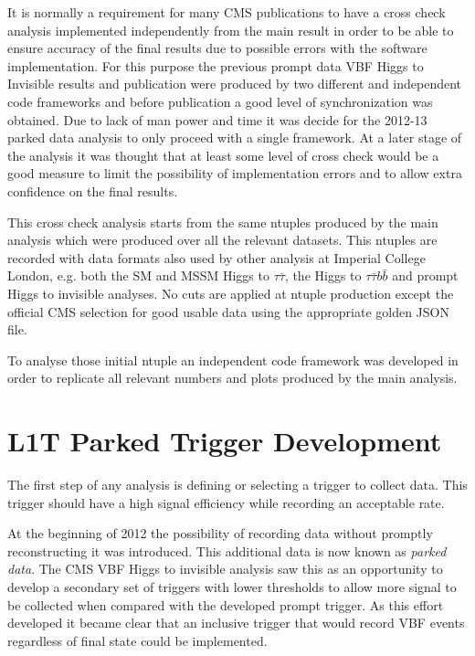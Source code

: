
It is normally a requirement for many CMS publications to have a cross check analysis implemented independently from the main result in order to be able to ensure accuracy of the final results due to possible errors with the software implementation. For this purpose the previous prompt data \gls{VBF} Higgs to Invisible results and publication were produced by two different and independent code frameworks and before publication a good level of synchronization was obtained. Due to lack of man power and time it was decide for the 2012-13 parked data analysis to only proceed with a single framework. At a later stage of the analysis it was thought that at least some level of cross check would be a good measure to limit the possibility of implementation errors and to allow extra confidence on the final results.
 
This cross check analysis starts from the same ntuples produced by the main analysis which were produced over all the relevant datasets. This ntuples are recorded with data formats also used by other analysis at Imperial College London, e.g. both the \gls{SM} and \gls{MSSM} Higgs to $\tau\bar{\tau}$, the Higgs to $\tau\bar{\tau}b\bar{b}$ and prompt Higgs to invisible analyses. No cuts are applied at ntuple production except the official \gls{CMS} selection for good usable data using the appropriate golden \gls{JSON} file.
 
To analyse those initial ntuple an independent code framework was developed in order to replicate all relevant numbers and plots produced by the main analysis.

\section{L1T Parked Trigger Development}
\label{SECTION:ParkedDataAnalysis_ParkedTriggerDevelopment}


The first step of any analysis is defining or selecting a trigger to collect data. This trigger should have a high signal efficiency while recording an acceptable rate.

At the beginning of 2012 the possibility of recording data without promptly reconstructing it was introduced. This additional data is now known as \textit{parked data}. The \gls{CMS} \gls{VBF} Higgs to invisible analysis saw this as an opportunity to develop a secondary set of triggers with lower thresholds to allow more signal to be collected when compared with the developed prompt trigger. As this effort developed it became clear that an inclusive trigger that would record \gls{VBF} events regardless of final state could be implemented.

